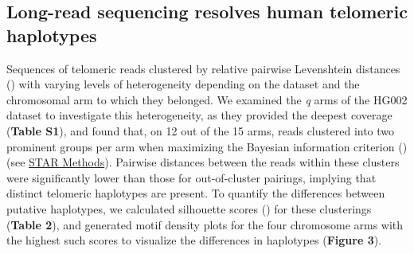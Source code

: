 \documentclass{article}
\newcommand{\citep}[1]{(\cite{#1})}
\begin{document}
\subsection*{Long-read sequencing resolves human telomeric haplotypes}
Sequences of telomeric reads clustered by relative pairwise Levenshtein distances \citep{levenshtein} with varying levels of heterogeneity depending on the dataset and the chromosomal arm to which they belonged.
We examined the \textit{q} arms of the HG002 dataset to investigate this heterogeneity, as they provided the deepest coverage (\textbf{Table S1}), and found that, on 12 out of the 15 arms, reads clustered into two prominent groups per arm when maximizing the Bayesian information criterion \citep{bic} (see \hyperref[sec:methods]{STAR Methods}).
Pairwise distances between the reads within these clusters were significantly lower than those for out-of-cluster pairings, implying that distinct telomeric haplotypes are present.
To quantify the differences between putative haplotypes, we calculated silhouette scores \citep{silhouette} for these clusterings (\textbf{Table 2}), and generated motif density plots for the four chromosome arms with the highest such scores to visualize the differences in haplotypes (\textbf{Figure 3}).
\end{document}
